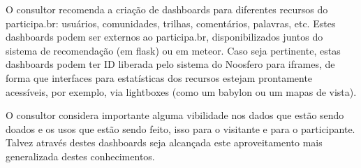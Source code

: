 \documentclass[12pt]{article}
\begin{document}
O consultor recomenda a criação de dashboards para diferentes recursos do participa.br: usuários, comunidades, trilhas, comentários, palavras, etc. Estes dashboards podem ser externos ao participa.br, disponibilizados juntos do sistema de recomendação (em flask) ou em meteor. Caso seja pertinente, estas dashboards podem ter ID liberada pelo sistema do Noosfero para iframes, de forma que interfaces para estatísticas dos recursos estejam prontamente acessíveis, por exemplo, via lightboxes (como um babylon ou um mapas de vista).

O consultor considera importante alguma vibilidade nos dados que estão sendo doados e os usos que estão sendo feito, isso para o visitante e para o participante. Talvez através destes dashboards seja alcançada este aproveitamento mais generalizada destes conhecimentos.
\end{document}
